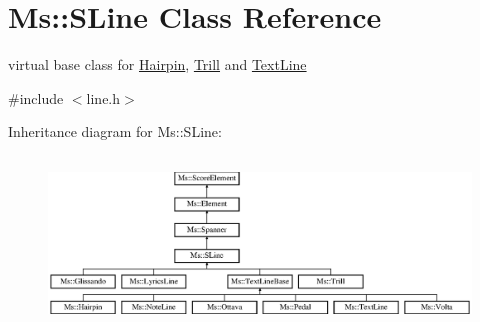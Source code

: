 \hypertarget{class_ms_1_1_s_line}{}\section{Ms\+:\+:S\+Line Class Reference}
\label{class_ms_1_1_s_line}


virtual base class for \hyperlink{class_ms_1_1_hairpin}{Hairpin}, \hyperlink{class_ms_1_1_trill}{Trill} and \hyperlink{class_ms_1_1_text_line}{Text\+Line}  




{\ttfamily \#include $<$line.\+h$>$}

Inheritance diagram for Ms\+:\+:S\+Line\+:\begin{figure}[H]
\begin{center}
\leavevmode
\includegraphics[height=4.628099cm]{class_ms_1_1_s_line}
\end{center}
\end{figure}
